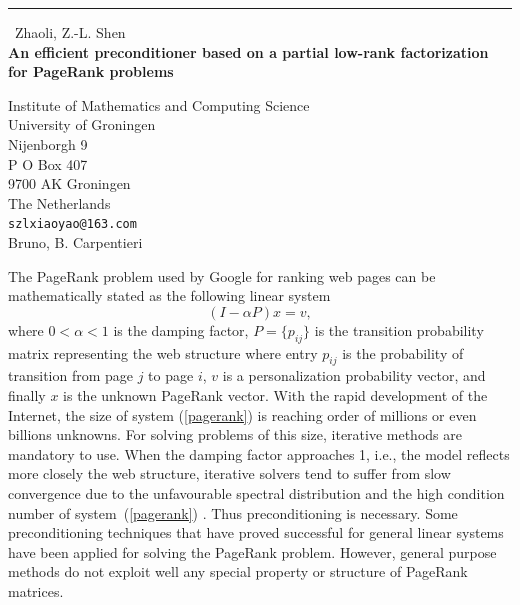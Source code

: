 \documentclass{report}
\begin{document}
\begin{center}
\rule{6in}{1pt} \
{\large Zhaoli, Z.-L. Shen \\
{\bf An efficient preconditioner based on a partial low-rank factorization for PageRank problems}}

Institute of Mathematics and Computing Science \\ University of Groningen \\ Nijenborgh 9 \\ P O Box 407 \\ 9700 AK Groningen \\ The Netherlands
\\
{\tt szlxiaoyao@163.com}\\
Bruno, B. Carpentieri\end{center}

The PageRank problem used by Google for ranking web pages can be
mathematically stated as the following linear system
\begin{equation}\label{pagerank}
(I-\alpha P)x=v,
\end{equation}
where $0<\alpha<1$ is the damping factor, $P=\{p_{ij}\}$ is the
transition probability matrix representing the web structure where entry
$p_{ij}$ is the probability of transition from page $j$ to page $i$, $v$
is a personalization probability vector, and finally $x$ is the unknown
PageRank vector. With the rapid development of the Internet, the size of
system (\ref{pagerank}) is reaching order of millions or even billions
unknowns. For solving problems of this size, iterative methods are
mandatory to use. When the damping factor approaches 1, i.e., the model
reflects more closely the web structure, iterative solvers tend to suffer
from slow convergence due to the unfavourable spectral distribution and
the high condition number of system~(\ref{pagerank}) \cite{ref1,ref2}.
Thus preconditioning is necessary. Some preconditioning techniques that
have proved successful for general linear systems have been applied for
solving the PageRank problem. However, general purpose methods do not
exploit well any special property or structure of PageRank matrices.
\end{document}
